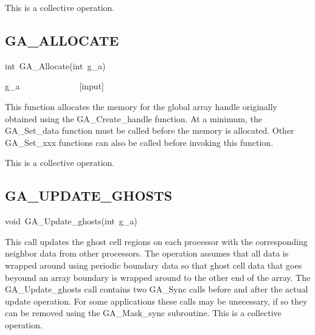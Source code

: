 This is a collective operation.


\subsection*{\label{sub:GA_ALLOCATE}GA\_ALLOCATE}
\begin{lyxcode}
int~GA\_Allocate(int~g\_a)



g\_a~~~~~~~~~~~~~~{[}input{]}
\end{lyxcode}
This function allocates the memory for the global array handle originally
obtained using the GA\_Create\_handle function. At a minimum, the
GA\_Set\_data function must be called before the memory is allocated.
Other GA\_Set\_xxx functions can also be called before invoking this
function.

This is a collective operation. 


\subsection*{\label{sub:GA_UPDATE_GHOSTS}GA\_UPDATE\_GHOSTS}
\begin{lyxcode}
void~GA\_Update\_ghosts(int~g\_a)
\end{lyxcode}
This call updates the ghost cell regions on each processor with the
corresponding neighbor data from other processors. The operation assumes
that all data is wrapped around using periodic boundary data so that
ghost cell data that goes beyound an array boundary is wrapped around
to the other end of the array. The GA\_Update\_ghosts call contains
two GA\_Sync calls before and after the actual update operation. For
some applications these calls may be unecessary, if so they can be
removed using the GA\_Mask\_sync subroutine. This is a collective
operation. 


